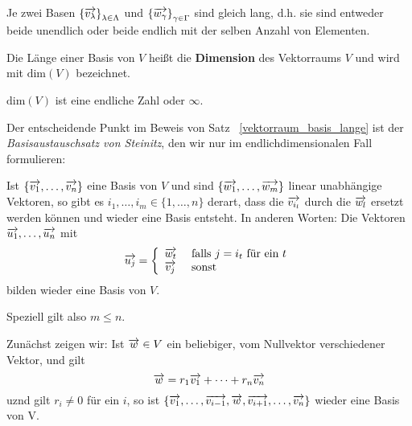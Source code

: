 \begin{satz}\label{vektorraum_basis_lange} Je zwei Basen $\left\{ \overrightarrow{v_{\lambda}} \right\}_{\lambda 
\in \Lambda}$ und 
$\left\{ \overrightarrow{w_{\gamma}} \right\}_{\gamma \in \Gamma}$ sind gleich lang, d.h. sie sind entweder 
beide unendlich oder beide endlich mit der selben Anzahl von Elementen.
\end{satz}

\begin{definition} Die Länge einer Basis von $V$ heißt die  
\textbf{Dimension} des Vektorraums $V$ und wird mit $\textrm{dim}(V)$ bezeichnet.
\end{definition} 

\begin{notiz} $\textrm{dim}(V)$ ist eine endliche Zahl oder $\infty$.
\end{notiz}

Der entscheidende Punkt im Beweis von Satz ~\ref{vektorraum_basis_lange} ist der \textit{Basisaustauschsatz von Steinitz}, den wir nur im endlichdimensionalen Fall formulieren:

\begin{satz} \label{steinitz} Ist $\{ \overrightarrow{v_1}, \ldots , \overrightarrow{v_n} \}$ eine 
Basis von $V$ und sind $\{ \overrightarrow{w_1}, \ldots , \overrightarrow{w_m} \}$ linear unabhängige Vektoren, so gibt es 
$i_1, \ldots, i_m \in \{1, \ldots, n \}$ derart, dass die $\overrightarrow{v_{i_l}}$ durch die 
$\overrightarrow{w_l}$ ersetzt werden können und wieder eine Basis entsteht. In anderen Worten: Die Vektoren 
$\overrightarrow{u_1}, \ldots, \overrightarrow{u_n}$ mit 
  	$$ \overrightarrow{u_j} = \left\{ \begin{array} {l l} 
	\overrightarrow{w_t} & \textrm{ falls } j = i_t \textrm{ für ein } t \\ 
	\overrightarrow{v_j} & \textrm{ sonst}
	\end{array} \right. $$
bilden wieder eine Basis von $V$.

Speziell gilt also $m \leq n$.
\end{satz}

\beweisvon{~\ref{steinitz}} Zunächst zeigen wir: Ist $\overrightarrow{w} \in V$ ein beliebiger, vom Nullvektor 
verschiedener Vektor, und gilt
  	\begin{equation}\label{eq: for w}
  	\overrightarrow{w} = r_1 \overrightarrow{v_1} + \cdots + r_n \overrightarrow{v_n}  
  	\end{equation} 
uznd gilt $r_i \neq 0$ für ein $i$, so ist $\{ \overrightarrow{v_1}, \ldots , \overrightarrow{v_{i-1}}, 
\overrightarrow{w}, \overrightarrow{v_{i+1}}, \ldots, \overrightarrow{v_n} \}$ wieder eine Basis von V.

